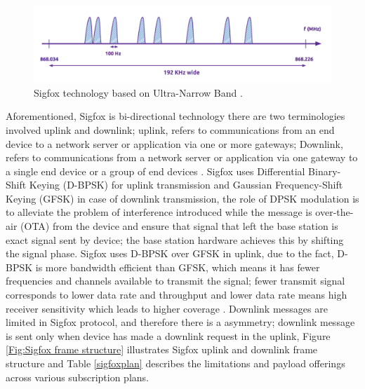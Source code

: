 \documentclass[12pt]{article}
\begin{document}
\begin{figure}[H]
  \includegraphics[width=\textwidth]{Images/sigfox_unb.png}
  \centering
  \caption{Sigfox technology based on Ultra-Narrow Band  \cite{SigfoxTechnicalDoc}.}
  \label{fig:Sigfox Technology based on UNB}
\end{figure}

Aforementioned, Sigfox is bi-directional technology there are two terminologies involved uplink and downlink; uplink, refers to communications from an end device to a network server or application via one or more gateways; Downlink, refers to communications from a network server or application via one gateway to a single end device or a group of end devices \cite{farrell2018low}. Sigfox uses Differential Binary-Shift Keying (D-BPSK) for uplink transmission and Gaussian Frequency-Shift Keying (GFSK) in case of downlink transmission, the role of DPSK modulation is to alleviate the problem of interference introduced while the message is over-the-air (OTA) from the device and ensure that signal that left the base station is exact signal sent by device; the base station hardware achieves this by shifting the signal phase. Sigfox uses D-BPSK over GFSK in uplink, due to the fact, D-BPSK is more bandwidth efficient than GFSK, which means it has fewer frequencies and channels available to transmit the signal; fewer transmit signal corresponds to lower data rate and throughput and lower data rate means high receiver sensitivity which leads to higher coverage  \cite{explainingSigfox}. Downlink messages are limited in Sigfox protocol, and therefore there is a asymmetry; downlink message is sent only when device has made a downlink request in the uplink, Figure \ref{Fig:Sigfox frame structure} illustrates Sigfox uplink and downlink frame structure and Table \ref{sigfoxplan} describes the limitations and payload offerings across various subscription plans.
\end{document}
